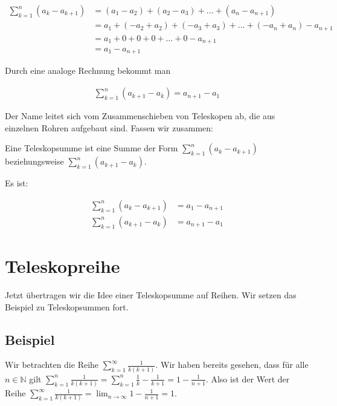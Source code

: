 \documentclass[fontsize=9pt,
               parskip=half-,
               DIV=14,
               listof=chapterentry,
               tocflat]{scrbook}
\begin{document}
\begin{align*}
\sum _{k=1}^{n}(a_{k}-a_{k+1})&=(a_{1}-a_{2})+(a_{2}-a_{3})+\ldots +(a_{n}-a_{n+1})\\&=a_{1}+(-a_{2}+a_{2})+(-a_{3}+a_{3})+\ldots +(-a_{n}+a_{n})-a_{n+1}\\&=a_{1}+0+0+0+\ldots +0-a_{n+1}\\&=a_{1}-a_{n+1}
\end{align*}

Durch eine analoge Rechnung bekommt man

\begin{align*}
\sum _{k=1}^{n}(a_{k+1}-a_{k})=a_{n+1}-a_{1}
\end{align*}

Der Name leitet sich vom Zusammenschieben von Teleskopen ab, die aus einzelnen Rohren aufgebaut sind. Fassen wir zusammen:

\begin{definition*}[Teleskopsumme]
Eine Teleskopsumme ist eine Summe der Form $\sum _{k=1}^{n}(a_{k}-a_{k+1})$ beziehungsweise $\sum _{k=1}^{n}(a_{k+1}-a_{k})$.

\end{definition*}

\begin{theorem*}
Es ist:

\begin{align*}
\sum _{k=1}^{n}(a_{k}-a_{k+1})&=a_{1}-a_{n+1}\\[0.5em]\sum _{k=1}^{n}(a_{k+1}-a_{k})&=a_{n+1}-a_{1}
\end{align*}

\end{theorem*}

\section{Teleskopreihe}

Jetzt übertragen wir die Idee einer Teleskopsumme auf Reihen. Wir setzen das Beispiel zu Teleskopsummen fort.

\subsection{Beispiel}

Wir betrachten die Reihe $\sum _{k=1}^{\infty }{\frac {1}{k(k+1)}}$. Wir haben bereits gesehen, dass für alle $n\in \mathbb {N} $ gilt $\sum _{k=1}^{n}{\frac {1}{k(k+1)}}=\sum _{k=1}^{n}{\frac {1}{k}}-{\frac {1}{k+1}}=1-{\frac {1}{n+1}}$. Also ist der Wert der Reihe $\sum _{k=1}^{\infty }{\frac {1}{k(k+1)}}=\lim _{n\to \infty }1-{\frac {1}{n+1}}=1$.
\end{document}
